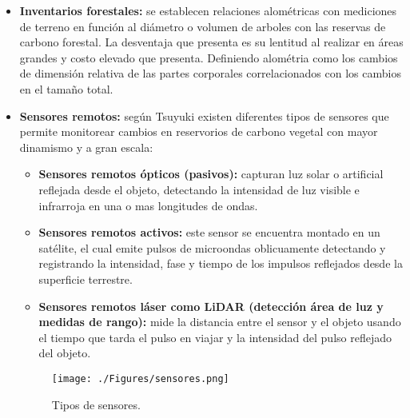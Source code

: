 \begin{itemize}
	
	\item \textbf{Inventarios forestales:} se establecen relaciones alom\'etricas con mediciones de terreno en funci\'on al diámetro o volumen de arboles con las reservas de carbono forestal. La desventaja que presenta es su lentitud al realizar en \'areas grandes y costo elevado que presenta\cite{asner2005selective}. Definiendo alom\'etria como los cambios de dimensión relativa de las partes corporales correlacionados con los cambios en el tamaño total. 
	\item \textbf{Sensores remotos:} seg\'un Tsuyuki\cite{libro2012Tsuyuki} existen diferentes tipos de sensores que permite monitorear cambios en reservorios de carbono vegetal con mayor dinamismo y a gran escala:
	\begin{itemize}
	\item \textbf{Sensores remotos \'opticos (pasivos):} capturan luz solar o artificial reflejada desde el objeto, detectando la intensidad de luz visible e infrarroja en una o mas longitudes de ondas.
	\item  \textbf{Sensores remotos activos:} este sensor se encuentra montado en un sat\'elite, el cual emite pulsos de microondas oblicuamente detectando y registrando la intensidad, fase y tiempo de los impulsos reflejados desde la superficie terrestre.
	\item  \textbf{Sensores remotos l\'aser como LiDAR (detecci\'on \'area de luz y medidas de rango):} mide la distancia entre el sensor y el objeto usando el tiempo que tarda el pulso en viajar y la intensidad del pulso reflejado del objeto.
	\end{itemize}
	    \begin{figure}[!hbtp]
	    	\centering
	    	\texttt{[image: ./Figures/sensores.png]}
	    	\caption{Tipos de sensores.}
	    	\label{fig:sensores}
	    \end{figure}
\end{itemize}


